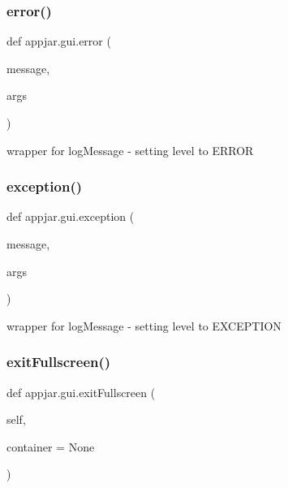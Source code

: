 \subsubsection{\texorpdfstring{error()}{error()}}
{\footnotesize\ttfamily def appjar.\+gui.\+error (\begin{DoxyParamCaption}\item[{}]{message,  }\item[{}]{args }\end{DoxyParamCaption})\hspace{0.3cm}{\ttfamily [static]}}

\begin{DoxyVerb}wrapper for logMessage - setting level to ERROR \end{DoxyVerb}
 \mbox{\label{classappjar_1_1gui_a7b8b2678ee341f64bfcbf2b7b018094f}} 
\subsubsection{\texorpdfstring{exception()}{exception()}}
{\footnotesize\ttfamily def appjar.\+gui.\+exception (\begin{DoxyParamCaption}\item[{}]{message,  }\item[{}]{args }\end{DoxyParamCaption})\hspace{0.3cm}{\ttfamily [static]}}

\begin{DoxyVerb}wrapper for logMessage - setting level to EXCEPTION \end{DoxyVerb}
 \mbox{\label{classappjar_1_1gui_a12568d9c85a65c4e0cf77f1f1f3c6acc}} 
\subsubsection{\texorpdfstring{exit\+Fullscreen()}{exitFullscreen()}}
{\footnotesize\ttfamily def appjar.\+gui.\+exit\+Fullscreen (\begin{DoxyParamCaption}\item[{}]{self,  }\item[{}]{container = {\ttfamily None} }\end{DoxyParamCaption})}

